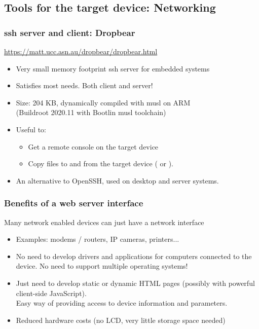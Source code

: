 \subsection[Networking tools]{Tools for the target device: Networking}

\begin{frame}
  \frametitle{ssh server and client: Dropbear}
  \url{https://matt.ucc.asn.au/dropbear/dropbear.html}
  \begin{itemize}
  \item Very small memory footprint ssh server for embedded systems
  \item Satisfies most needs. Both client and server!
  \item Size: 204 KB, dynamically compiled with musl on ARM\\
        (Buildroot 2020.11 with Bootlin musl toolchain)
  \item Useful to:
    \begin{itemize}
    \item Get a remote console on the target device
    \item Copy files to and from the target device ( or
      ).
    \end{itemize}
  \item An alternative to OpenSSH, used on desktop and server systems.
  \end{itemize}
\end{frame}

\begin{frame}
  \frametitle{Benefits of a web server interface}

  Many network enabled devices can just have a network interface

  \begin{itemize}
  \item Examples: modems / routers, IP cameras, printers...
  \item No need to develop drivers and applications for computers
    connected to the device. No need to support multiple operating
    systems!
  \item Just need to develop static or dynamic HTML pages (possibly
    with powerful client-side JavaScript).\\
    Easy way of providing access to device information and parameters.
  \item Reduced hardware costs (no LCD, very little storage space
    needed)
  \end{itemize}
\end{frame}

